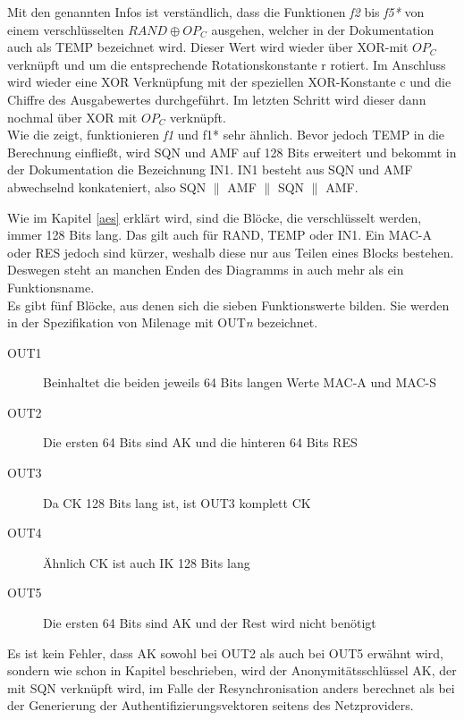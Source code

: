 Mit den genannten Infos ist verständlich, dass die Funktionen \emph{f2} bis \emph{f5*}
von einem verschlüsselten $RAND \oplus OP_C$ ausgehen, welcher in der Dokumentation
 auch als TEMP bezeichnet wird. Dieser Wert wird wieder über XOR-mit $OP_ C$ verknüpft
 und um die entsprechende Rotationskonstante r rotiert. Im Anschluss wird wieder eine XOR
 Verknüpfung mit der speziellen XOR-Konstante c und die Chiffre des Ausgabewertes durchgeführt. Im
 letzten Schritt wird dieser dann nochmal über XOR mit $OP_{C}$ verknüpft. \\
 Wie die  zeigt, funktionieren \emph{f1} und {f1*} sehr
 ähnlich. Bevor jedoch TEMP in die Berechnung einfließt, wird SQN und AMF auf 128 Bits
 erweitert und bekommt in der Dokumentation die Bezeichnung IN1. IN1 besteht aus SQN und
 AMF abwechselnd konkateniert, also SQN $\|$ AMF $\|$ SQN $\|$ AMF. \cite{3gpp.33.102}
 
 Wie im Kapitel \ref{aes} erklärt wird, sind die Blöcke, die verschlüsselt werden, immer
 128 Bits lang. Das gilt auch für RAND, TEMP oder IN1. Ein MAC-A oder RES
 jedoch sind kürzer, weshalb diese nur aus Teilen eines Blocks bestehen. Deswegen steht
 an manchen Enden des Diagramms in  auch mehr als ein
 Funktionsname. \\
 Es gibt fünf Blöcke, aus denen sich die sieben Funktionswerte bilden. Sie werden in der
 Spezifikation von Milenage mit OUT\emph{n} bezeichnet.
 
 \begin{description}
  \item [OUT1] Beinhaltet die beiden jeweils 64 Bits langen Werte MAC-A und MAC-S
  \item [OUT2] Die ersten 64 Bits sind AK und die hinteren 64 Bits RES
  \item [OUT3] Da CK 128 Bits lang ist, ist OUT3 komplett CK
  \item [OUT4] Ähnlich CK ist auch IK 128 Bits lang
  \item [OUT5] Die ersten 64 Bits sind AK und der Rest wird nicht benötigt
 \end{description}
 
 Es ist kein Fehler, dass AK sowohl bei OUT2 als auch bei OUT5 erwähnt wird, sondern
 wie schon in Kapitel  beschrieben, wird
 der Anonymitätsschlüssel AK, der mit SQN verknüpft wird, im Falle der Resynchronisation
 anders berechnet als bei der Generierung der Authentifizierungsvektoren seitens des
 Netzproviders.
 
